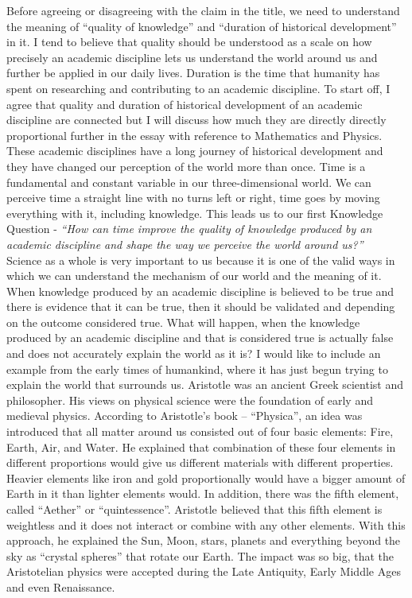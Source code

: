 \documentclass[12pt,a4paper]{article}
\begin{document}
Before agreeing or disagreeing with the claim in the title, we need to understand the meaning of ``quality of knowledge'' and
``duration of historical development'' in it. I tend to believe that quality should be understood as a scale on how precisely an academic discipline lets us understand the world around us and further be applied in our daily lives. Duration is the time that humanity has spent on researching and contributing to an academic discipline. To start off, I agree that quality and duration of historical development of an academic discipline are connected but I will discuss how much they are directly directly proportional further in the essay with reference to Mathematics and Physics. These academic disciplines have a long journey of historical development and they have changed our perception of the world more than once. Time is a fundamental and constant variable in our three-dimensional world\cite{time}.  We can perceive time a straight line with no turns left or right, time goes by moving everything with it, including knowledge. This leads us to our first Knowledge Question - \textit{“How can time improve the quality of knowledge produced by an academic discipline and shape the way we perceive the world around us?”}\\

Science as a whole is very important to us because it is one of the valid ways in which we can understand the mechanism of our world and the meaning of it. When knowledge produced by an academic discipline is believed to be true and there is evidence that it can be true, then it should be validated and depending on the outcome considered true. What will happen, when the knowledge produced by an academic discipline and that is considered true is actually false and does not accurately explain the world as it is? I would like to include an example from the early times of humankind, where it has just begun trying to explain the world that surrounds us. Aristotle was an ancient Greek scientist and philosopher. His views on physical science were the foundation of early and medieval physics. According to Aristotle’s book – “Physica”, an idea was introduced that all matter around us consisted out of four basic elements: Fire, Earth, Air, and Water\cite{aether}. He explained that combination of these four elements in different proportions would give us different materials with different properties. Heavier elements like iron and gold proportionally would have a bigger amount of Earth in it than lighter elements would. In addition, there was the fifth element, called “Aether” or “quintessence”. Aristotle believed that this fifth element is weightless and it does not interact or combine with any other elements. With this approach, he explained the Sun, Moon, stars, planets and everything beyond the sky as “crystal spheres” that rotate our Earth. The impact was so big, that the Aristotelian physics were accepted during the Late Antiquity, Early Middle Ages and even Renaissance. \\
\end{document}
